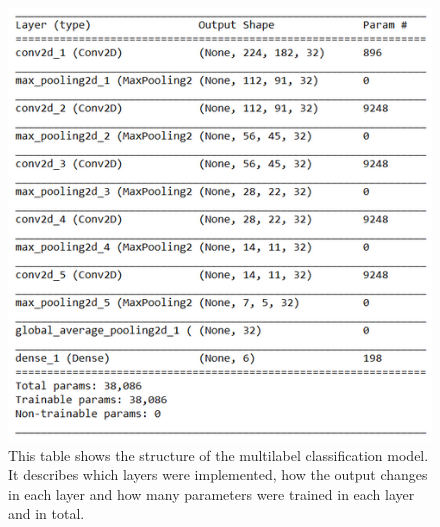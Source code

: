 \\
\begin{figure}[h]
	\centering
	\includegraphics[scale=0.6]{Figures/chapter04/multilabel_structure}
	\decoRule
	\caption[Model Structure]{This table shows the structure of the multilabel classification model. It describes which layers were implemented, how the output changes in each layer and how many parameters were trained in each layer and in total.}
	\label{fig:MultilabelStructure}
\end{figure}

